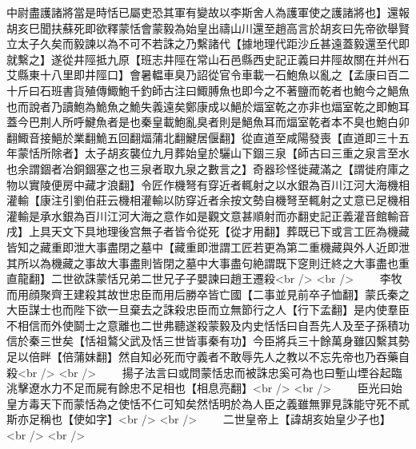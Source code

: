 中尉盡護諸將當是時恬已屬吏恐其軍有變故以李斯舍人為護軍使之護諸將也】還報胡亥巳聞扶蘇死即欲釋蒙恬會蒙毅為始皇出禱山川還至趙高言於胡亥曰先帝欲舉賢立太子久矣而毅諫以為不可不若誅之乃繫諸代【據地理代距沙丘甚遠蓋毅還至代即就繫之】遂從井陘抵九原【班志井陘在常山石邑縣西史記正義曰井陘故關在并州石艾縣東十八里即井陘口】會暑輼車臭乃詔從官令車載一石鮑魚以亂之【孟康曰百二十斤曰石班書貨殖傳鯫鮑千釣師古注曰鯫膊魚也即今之不著鹽而乾者也鮑今之䱒魚也而說者乃讀鮑為鮠魚之鮠失義遠矣鄭康成以䱒於煏室乾之亦非也煏室乾之即鮑耳蓋今巴荆人所呼鰎魚者是也秦皇載鮑亂臭者則是䱒魚耳而煏室乾者本不臭也鮑白卯翻鯫音接䱒於業翻鮠五回翻煏蒲北翻鰎居偃翻】從直道至咸陽發喪【直道即三十五年蒙恬所除者】太子胡亥襲位九月葬始皇於驪山下錮三泉【師古曰三重之泉言至水也余謂錮者冶銅錮塞之也三泉者取九泉之數言之】奇器珍怪徙藏滿之【謂徙府庫之物以實陵便房中藏才浪翻】令匠作機弩有穿近者輒射之以水銀為百川江河大海機相灌輸【康注引劉伯莊云機相灌輸以防穿近者余按文勢自機弩至輒射之丈意已足機相灌輸是承水銀為百川江河大海之意作如是觀文意甚順射而亦翻史記正義灌音館輸音戌】上具天文下具地理後宫無子者皆令從死【從才用翻】葬既已下或言工匠為機藏皆知之藏重即泄大事盡閉之墓中【藏重即泄謂工匠若更為第二重機藏與外人近即泄其所以為機藏之事故大事盡則皆閉之墓中大事盡句絶謂既下窆則迀終之大事盡也重直龍翻】二世欲誅蒙恬兄弟二世兄子子嬰諫曰趙王遷殺<br />
<br />
　　李牧而用顔聚齊王建殺其故世忠臣而用后勝卒皆亡國【二事並見前卒子恤翻】蒙氏秦之大臣謀士也而陛下欲一旦棄去之誅殺忠臣而立無節行之人【行下孟翻】是内使羣臣不相信而外使鬬士之意離也二世弗聽遂殺蒙毅及内史恬恬曰自吾先人及至子孫積功信於秦三世矣【恬祖鷔父武及恬三世皆事秦有功】今臣將兵三十餘萬身雖囚繫其勢足以倍畔【倍蒲妹翻】然自知必死而守義者不敢辱先人之教以不忘先帝也乃吞藥自殺<br />
<br />
　　揚子法言曰或問蒙恬忠而被誅忠奚可為也曰塹山堙谷起臨洮擊遼水力不足而屍有餘忠不足相也【相息亮翻】<br />
<br />
　　臣光曰始皇方毒天下而蒙恬為之使恬不仁可知矣然恬明於為人臣之義雖無罪見誅能守死不貳斯亦足稱也【使如字】<br />
<br />
　　二世皇帝上【諱胡亥始皇少子也】<br />
<br />
